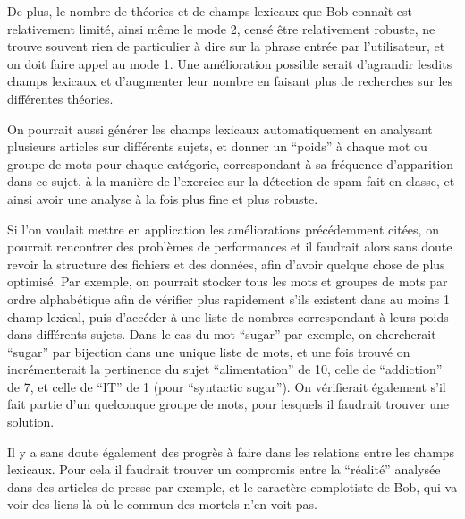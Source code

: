 \documentclass[paper=a4, 12pt]{report}
\begin{document}
\vspace{0.5cm}

De plus, le nombre de théories et de champs lexicaux que Bob connaît est relativement limité, ainsi même le mode 2, censé être relativement robuste, ne trouve souvent rien de particulier à dire sur la phrase entrée par l’utilisateur, et on doit faire appel au mode 1. Une amélioration possible serait d’agrandir lesdits champs lexicaux et d’augmenter leur nombre en faisant plus de recherches sur les différentes théories.

\vspace{0.5cm}

On pourrait aussi générer les champs lexicaux automatiquement en analysant plusieurs articles sur différents sujets, et donner un “poids” à chaque mot ou groupe de mots pour chaque catégorie, correspondant à sa fréquence d’apparition dans ce sujet, à la manière de l’exercice sur la détection de spam fait en classe, et ainsi avoir une analyse à la fois plus fine et plus robuste.

\vspace{0.5cm}

Si l’on voulait mettre en application les améliorations précédemment citées, on pourrait rencontrer des problèmes de performances et il faudrait alors sans doute revoir la structure des fichiers et des données, afin d’avoir quelque chose de plus optimisé. Par exemple, on pourrait stocker tous les mots et groupes de mots par ordre alphabétique afin de vérifier plus rapidement s’ils existent dans au moins 1 champ lexical, puis d’accéder à une liste de nombres correspondant à leurs poids dans différents sujets. Dans le cas du mot “sugar” par exemple, on chercherait “sugar” par bijection dans une unique liste de mots, et une fois trouvé on incrémenterait la pertinence du sujet “alimentation” de 10, celle de “addiction” de 7, et celle de “IT” de 1 (pour “syntactic sugar”). On vérifierait également s’il fait partie d’un quelconque groupe de mots, pour lesquels il faudrait trouver une solution.

\vspace{0.5cm}

Il y a sans doute également des progrès à faire dans les relations entre les champs lexicaux. Pour cela il faudrait trouver un compromis entre la “réalité” analysée dans des articles de presse par exemple, et le caractère complotiste de Bob, qui va voir des liens là où le commun des mortels n’en voit pas.

\vspace{0.5cm}
\end{document}
